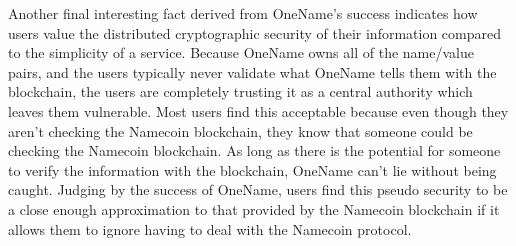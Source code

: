 Another final interesting fact derived from OneName's success indicates how users value the distributed cryptographic security of their information compared to the simplicity of a service. Because OneName owns all of the name/value pairs, and the users typically never validate what OneName tells them with the blockchain, the users are completely trusting it as a central authority which leaves them vulnerable. Most users find this acceptable because even though they aren't checking the Namecoin blockchain, they know that someone could be checking the Namecoin blockchain. As long as there is the potential for someone to verify the information with the blockchain, OneName can't lie without being caught. Judging by the success of OneName, users find this pseudo security to be a close enough approximation to that provided by the Namecoin blockchain if it allows them to ignore having to deal with the Namecoin protocol.


